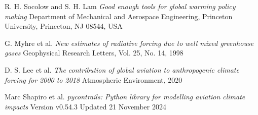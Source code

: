 \documentclass{article}
\begin{document}
\begin{thebibliography}{9}


    R. H. Socolow and S. H. Lam
    \emph{Good enough tools for global warming policy making}
    Department of Mechanical and Aerospace Engineering, Princeton University,
    Princeton, NJ 08544, USA

    G. Myhre et al.
    \emph{New estimates of radiative forcing due to well mixed greenhouse gases}
    Geophysical Research Letters, Vol. 25, No. 14, 1998

    D. S. Lee et al.
    \emph{The contribution of global aviation to anthropogenic climate forcing for 2000 to 2018}
    Atmospheric Environment, 2020

    Marc Shapiro et al.
    \emph{pycontrails: Python library for modelling aviation climate impacts}
    Version v0.54.3 Updated 21 November 2024

\end{thebibliography}
\end{document}
